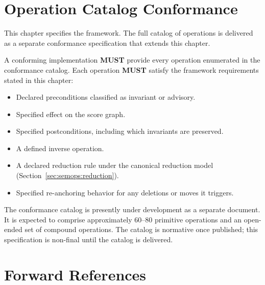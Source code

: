 \documentclass[11pt,letterpaper]{report}
\newcounter{requirement}[chapter]
\newcommand{\MUST}{\textbf{MUST}}
\begin{document}
\section{Operation Catalog Conformance}
\label{sec:semops:catalog}

This chapter specifies the framework. The full catalog of operations
is delivered as a separate conformance specification that extends
this chapter.

\begin{requirement}
  \label{req:semops:operation-catalog-coverage}
  A conforming implementation \MUST{} provide every operation
  enumerated in the conformance catalog. Each operation \MUST{}
  satisfy the framework requirements stated in this chapter:

  \begin{itemize}
    \item Declared preconditions classified as invariant or advisory.
    \item Specified effect on the score graph.
    \item Specified postconditions, including which invariants are
      preserved.
    \item A defined inverse operation.
    \item A declared reduction rule under the canonical reduction
      model (Section~\ref{sec:semops:reduction}).
    \item Specified re-anchoring behavior for any deletions or
      moves it triggers.
  \end{itemize}
\end{requirement}

\begin{openquestion}
  The conformance catalog is presently under development as a separate
  document. It is expected to comprise approximately 60--80 primitive
  operations and an open-ended set of compound operations. The catalog
  is normative once published; this specification is non-final until
  the catalog is delivered.
\end{openquestion}

\section{Forward References}
\end{document}
